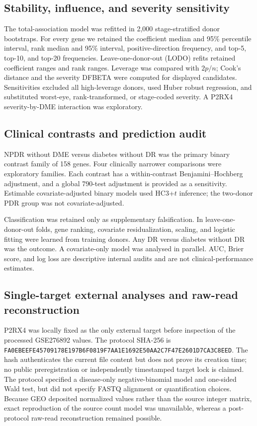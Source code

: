 \documentclass[12pt]{article}
\begin{document}
\subsection{Stability, influence, and severity sensitivity}

The total-association model was refitted in 2,000 stage-stratified donor bootstraps. For every gene we retained the coefficient median and 95\% percentile interval, rank median and 95\% interval, positive-direction frequency, and top-5, top-10, and top-20 frequencies. Leave-one-donor-out (LODO) refits retained coefficient ranges and rank ranges. Leverage was compared with $2p/n$; Cook's distance and the severity DFBETA were computed for displayed candidates. Sensitivities excluded all high-leverage donors, used Huber robust regression, and substituted worst-eye, rank-transformed, or stage-coded severity. A P2RX4 severity-by-DME interaction was exploratory.

\subsection{Clinical contrasts and prediction audit}

NPDR without DME versus diabetes without DR was the primary binary contrast family of 158 genes. Four clinically narrower comparisons were exploratory families. Each contrast has a within-contrast Benjamini--Hochberg adjustment, and a global 790-test adjustment is provided as a sensitivity. Estimable covariate-adjusted binary models used HC3+$t$ inference; the two-donor PDR group was not covariate-adjusted.

Classification was retained only as supplementary falsification. In leave-one-donor-out folds, gene ranking, covariate residualization, scaling, and logistic fitting were learned from training donors. Any DR versus diabetes without DR was the outcome. A covariate-only model was analysed in parallel. AUC, Brier score, and log loss are descriptive internal audits and are not clinical-performance estimates.

\subsection{Single-target external analyses and raw-read reconstruction}

P2RX4 was locally fixed as the only external target before inspection of the processed GSE276892 values. The protocol SHA-256 is {\footnotesize\texttt{FA0EBEEF\allowbreak E4570917\allowbreak 8E197B6F\allowbreak 0819F7AA\allowbreak 1E1692E5\allowbreak 0AA2C7F4\allowbreak 7E2601D7\allowbreak CA3C8EED}}. The hash authenticates the current file content but does not prove its creation time; no public preregistration or independently timestamped target lock is claimed. The protocol specified a disease-only negative-binomial model and one-sided Wald test, but did not specify FASTQ alignment or quantification choices. Because GEO deposited normalized values rather than the source integer matrix, exact reproduction of the source count model was unavailable, whereas a post-protocol raw-read reconstruction remained possible.
\end{document}
